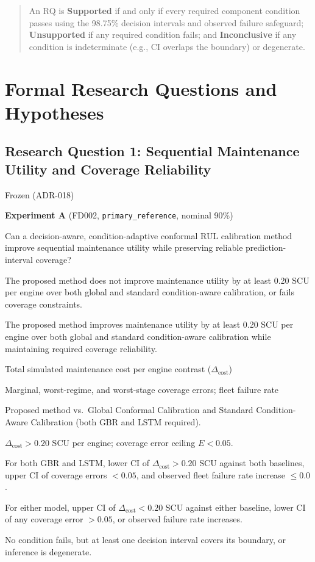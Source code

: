 \documentclass{article}
\begin{document}
\begin{quote}
An RQ is \textbf{Supported} if and only if every required component condition passes using the 98.75\% decision intervals and observed failure safeguard; \textbf{Unsupported} if any required condition fails; and \textbf{Inconclusive} if any condition is indeterminate (e.g., CI overlaps the boundary) or degenerate.
\end{quote}

\section*{Formal Research Questions and Hypotheses}

\subsection*{Research Question 1: Sequential Maintenance Utility and Coverage Reliability}
\begin{description}[style=multiline,leftmargin=3.5cm]
  \item[Status:] Frozen (ADR-018)
  \item[Experiment:] \textbf{Experiment A} (FD002, \texttt{primary\_reference}, nominal 90\%)
  \item[Question:] Can a decision-aware, condition-adaptive conformal RUL calibration method improve sequential maintenance utility while preserving reliable prediction-interval coverage?
  \item[Null ($H_{0,1}$):] The proposed method does not improve maintenance utility by at least 0.20 SCU per engine over both global and standard condition-aware calibration, or fails coverage constraints.
  \item[Alt ($H_{1,1}$):] The proposed method improves maintenance utility by at least 0.20 SCU per engine over both global and standard condition-aware calibration while maintaining required coverage reliability.
  \item[Primary Outcome:] Total simulated maintenance cost per engine contrast ($\Delta_{\text{cost}}$)
  \item[Supporting Outcomes:] Marginal, worst-regime, and worst-stage coverage errors; fleet failure rate
  \item[Comparison:] Proposed method vs.\ Global Conformal Calibration and Standard Condition-Aware Calibration (both GBR and LSTM required).
  \item[Threshold:] $\Delta_{\text{cost}} > 0.20$ SCU per engine; coverage error ceiling $E < 0.05$.
  \item[Supported Logic:] For both GBR and LSTM, lower CI of $\Delta_{\text{cost}} > 0.20$ SCU against both baselines, upper CI of coverage errors $< 0.05$, and observed fleet failure rate increase $\le 0.0$.
  \item[Unsupported Logic:] For either model, upper CI of $\Delta_{\text{cost}} < 0.20$ SCU against either baseline, lower CI of any coverage error $> 0.05$, or observed failure rate increases.
  \item[Inconclusive Logic:] No condition fails, but at least one decision interval covers its boundary, or inference is degenerate.
\end{description}
\end{document}
